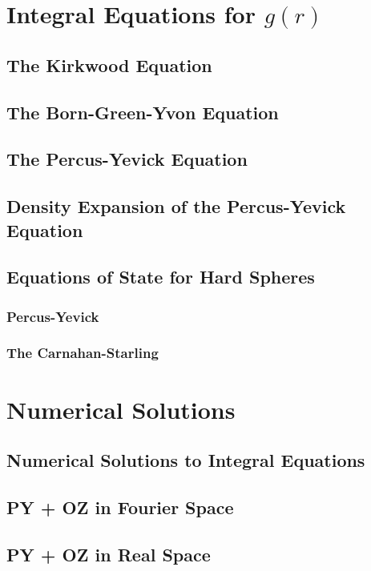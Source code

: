 \documentclass[a4paper,11pt]{article}
\begin{document}
\section{Integral Equations for $g(r)$}\label{sec:integral}

\subsection{The Kirkwood Equation}\label{ssec:kirkwood}

\subsection{The Born-Green-Yvon Equation}\label{ssec:born}
\subsection{The Percus-Yevick Equation}
\subsection{Density Expansion of the Percus-Yevick Equation}
\subsection{Equations of State for Hard Spheres}
\subsubsection{Percus-Yevick}
\subsubsection{The Carnahan-Starling}

\section{Numerical Solutions}
\subsection{Numerical Solutions to Integral Equations}

\subsection{PY + OZ in Fourier Space}

\subsection{PY + OZ in Real Space}

\end{document}
